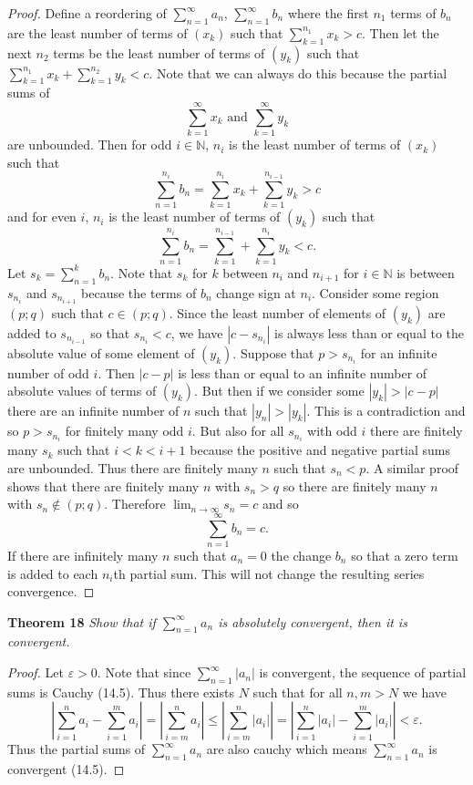 \documentclass{article}
\begin{document}
\begin{flushleft}
\begin{proof}
Define a reordering of $\sum_{n=1}^{\infty} a_n$, $\sum_{n=1}^{\infty} b_n$ where the first $n_1$ terms of $b_n$ are the least number of terms of $(x_k)$ such that $\sum_{k=1}^{n_1} x_k > c$. Then let the next $n_2$ terms be the least number of terms of $(y_k)$ such that $\sum_{k=1}^{n_1} x_k + \sum_{k=1}^{n_2} y_k < c$. Note that we can always do this because the partial sums of
\[
\sum_{k=1}^{\infty} x_k \text{ and } \sum_{k=1}^{\infty} y_k
\]
are unbounded. Then for odd $i \in \mathbb{N}$, $n_i$ is the least number of terms of $(x_k)$ such that
\[
\sum_{n=1}^{n_i} b_n = \sum_{k=1}^{n_i} x_k + \sum_{k=1}^{n_{i-1}} y_k > c
\]
and for even $i$, $n_i$ is the least number of terms of $(y_k)$ such that
\[
\sum_{n=1}^{n_i} b_n = \sum_{k=1}^{n_{i-1}} + \sum_{k=1}^{n_i} y_k < c.
\]
Let $s_k = \sum_{n=1}^{k} b_n$. Note that $s_k$ for $k$ between $n_i$ and $n_{i+1}$ for $i \in \mathbb{N}$ is between $s_{n_i}$ and $s_{n_{i+1}}$ because the terms of $b_n$ change sign at $n_i$. Consider some region $(p;q)$ such that $c \in (p;q)$. Since the least number of elements of $(y_k)$ are added to $s_{n_{i-1}}$ so that $s_{n_i} < c$, we have $|c - s_{n_i}|$ is always less than or equal to the absolute value of some element of $(y_k)$. Suppose that $p > s_{n_i}$ for an infinite number of odd $i$. Then $|c-p|$ is less than or equal to an infinite number of absolute values of terms of $(y_k)$. But then if we consider some $|y_k| > |c-p|$ there are an infinite number of $n$ such that $|y_n| > |y_k|$. This is a contradiction and so $p > s_{n_i}$ for finitely many odd $i$. But also for all $s_{n_i}$ with odd $i$ there are finitely many $s_k$ such that $i < k < i+1$ because the positive and negative partial sums are unbounded. Thus there are finitely many $n$ such that $s_n < p$. A similar proof shows that there are finitely many $n$ with $s_n > q$ so there are finitely many $n$ with $s_n \notin (p;q)$. Therefore $\lim_{n \rightarrow \infty} s_n = c$ and so
\[
\sum_{n=1}^{\infty} b_n = c.
\]
If there are infinitely many $n$ such that $a_n=0$ the change $b_n$ so that a zero term is added to each $n_i$th partial sum. This will not change the resulting series convergence.
\end{proof}

\textbf{Theorem 18}
\textsl{Show that if $\sum_{n=1}^{\infty} a_n$ is absolutely convergent, then it is convergent.}
\begin{proof}
Let $\varepsilon > 0$. Note that since $\sum_{n=1}^{\infty} |a_n|$ is convergent, the sequence of partial sums is Cauchy (14.5). Thus there exists $N$ such that for all $n,m > N$ we have
\[
\left | \sum_{i=1}^n a_i - \sum_{i=1}^m a_i \right | = \left | \sum_{i=m}^n a_i \right | \leq \left | \sum_{i=m}^n |a_i| \right | = \left | \sum_{i=1}^n |a_i| - \sum_{i=1}^m |a_i| \right | < \varepsilon.
\]
Thus the partial sums of $\sum_{n=1}^{\infty} a_n$ are also cauchy which means $\sum_{n=1}^{\infty} a_n$ is convergent (14.5).
\end{proof}

\end{flushleft}
\end{document}
